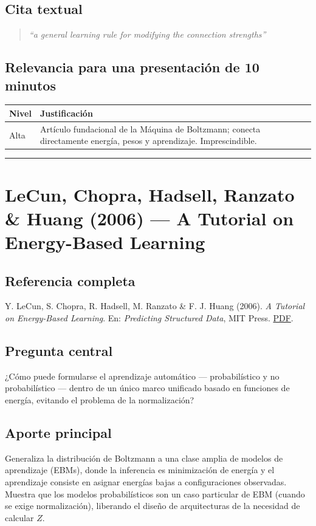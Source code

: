 \documentclass[12pt]{article}
\begin{document}
\subsection*{Cita textual}
\begin{quote}
\textit{``a general learning rule for modifying the connection strengths''}
\end{quote}

\subsection*{Relevancia para una presentación de 10 minutos}
\begin{tabular}{@{}p{2cm}p{11.5cm}@{}}
\toprule
\textbf{Nivel} & \textbf{Justificación} \\
\midrule
Alta & Artículo fundacional de la Máquina de Boltzmann; conecta directamente energía, pesos y aprendizaje. Imprescindible. \\
\bottomrule
\end{tabular}

\bigskip
\hrule
\bigskip

\section{LeCun, Chopra, Hadsell, Ranzato \& Huang (2006) --- A Tutorial on Energy-Based Learning}

\subsection*{Referencia completa}
Y. LeCun, S. Chopra, R. Hadsell, M. Ranzato \& F. J. Huang (2006). \textit{A Tutorial on
Energy-Based Learning}. En: \textit{Predicting Structured Data}, MIT Press.
\href{http://yann.lecun.com/exdb/publis/pdf/lecun-06.pdf}{PDF}. \cite{lecun2006}

\subsection*{Pregunta central}
¿Cómo puede formularse el aprendizaje automático --- probabilístico y no probabilístico ---
dentro de un único marco unificado basado en funciones de energía, evitando el problema de la
normalización?

\subsection*{Aporte principal}
Generaliza la distribución de Boltzmann a una clase amplia de modelos de aprendizaje (EBMs),
donde la inferencia es minimización de energía y el aprendizaje consiste en asignar energías
bajas a configuraciones observadas. Muestra que los modelos probabilísticos son un caso
particular de EBM (cuando se exige normalización), liberando el diseño de arquitecturas de la
necesidad de calcular $Z$.
\end{document}
